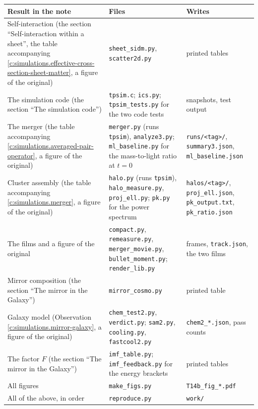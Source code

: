 \documentclass[11pt]{article}
\theoremstyle{definition}
\theoremstyle{plain}
\providecommand{\file}{}\renewcommand{\file}[1]{\texttt{#1}}
\begin{document}
\centering \begin{tabular}{@{}>{ \arraybackslash}p{}>{ \arraybackslash}p{}>{ \arraybackslash}p{}@{}}
\toprule
Result in the note & Files & Writes \\
\midrule
Self-interaction (the section ``Self-interaction within a sheet'', the table accompanying \ref{c:simulations.effective-cross-section-sheet-matter}, a figure of the original) & \file{sheet\_sidm.py}, \file{scatter2d.py} & printed tables \\
The simulation code (the section ``The simulation code'') & \file{tpsim.c}; \file{ics.py}; \file{tpsim\_tests.py} for the two code tests & snapshots, test output \\
The merger (the table accompanying \ref{c:simulations.averaged-pair-operator}, a figure of the original) & \file{merger.py} (runs \file{tpsim}), \file{analyze3.py}; \file{ml\_baseline.py} for the mass-to-light ratio at $t = 0$ & \file{runs/<tag>/}, \file{summary3.json}, \file{ml\_baseline.json} \\
Cluster assembly (the table accompanying \ref{c:simulations.merger}, a figure of the original) & \file{halo.py} (runs \file{tpsim}), \file{halo\_measure.py}, \file{proj\_ell.py}; \file{pk.py} for the power spectrum & \file{halos/<tag>/}, \file{proj\_ell.json}, \file{pk\_output.txt}, \file{pk\_ratio.json} \\
The films and a figure of the original & \file{compact.py}, \file{remeasure.py}, \file{merger\_movie.py}, \file{bullet\_moment.py}; \file{render\_lib.py} & frames, \file{track.json}, the two films \\
Mirror composition (the section ``The mirror in the Galaxy'') & \file{mirror\_cosmo.py} & printed table \\
Galaxy model (Observation \ref{c:simulations.mirror-galaxy}, a figure of the original) & \file{chem\_test2.py}, \file{verdict.py}; \file{sam2.py}, \file{cooling.py}, \file{fastcool2.py} & \file{chem2\_*.json}, pass counts \\
The factor $F$ (the section ``The mirror in the Galaxy'') & \file{imf\_table.py}; \file{imf\_feedback.py} for the energy brackets & printed tables \\
All figures & \file{make\_figs.py} & \file{T14b\_fig\_*.pdf} \\
All of the above, in order & \file{reproduce.py} & \file{work/} \\
\bottomrule
\end{tabular}
\end{document}
